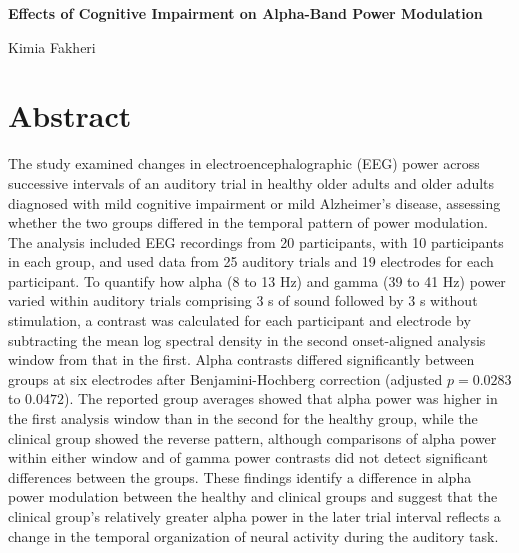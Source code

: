 \documentclass[11pt,letterpaper]{article}
\begin{document}
\begin{center}
{\fontsize{16}{19}\selectfont\bfseries Effects of Cognitive Impairment on Alpha-Band Power Modulation\par}
\vspace{6pt}
{\normalsize Kimia Fakheri}
\end{center}
\vspace{3pt}
\fontsize{10.5}{12.4}\selectfont


\section*{Abstract}
\noindent The study examined changes in electroencephalographic (EEG) power across successive intervals of an auditory trial in healthy older adults and older adults diagnosed with mild cognitive impairment or mild Alzheimer's disease, assessing whether the two groups differed in the temporal pattern of power modulation. The analysis included EEG recordings from 20 participants, with 10 participants in each group, and used data from 25 auditory trials and 19 electrodes for each participant. To quantify how alpha (8 to 13 Hz) and gamma (39 to 41 Hz) power varied within auditory trials comprising 3 s of sound followed by 3 s without stimulation, a contrast was calculated for each participant and electrode by subtracting the mean log spectral density in the second onset-aligned analysis window from that in the first. Alpha contrasts differed significantly between groups at six electrodes after Benjamini-Hochberg correction (adjusted \(p=0.0283\) to \(0.0472\)). The reported group averages showed that alpha power was higher in the first analysis window than in the second for the healthy group, while the clinical group showed the reverse pattern, although comparisons of alpha power within either window and of gamma power contrasts did not detect significant differences between the groups. These findings identify a difference in alpha power modulation between the healthy and clinical groups and suggest that the clinical group's relatively greater alpha power in the later trial interval reflects a change in the temporal organization of neural activity during the auditory task.
\end{document}
